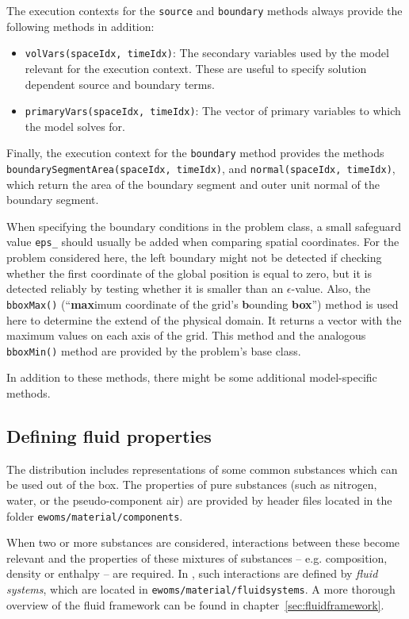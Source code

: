 The execution contexts for the \texttt{source} and \texttt{boundary}
methods always provide the following methods in addition:
\begin{itemize}
\item \texttt{volVars(spaceIdx, timeIdx)}: The secondary variables
  used by the model relevant for the execution context. These are
  useful to specify solution dependent source and boundary terms.
\item \texttt{primaryVars(spaceIdx, timeIdx)}: The vector of primary
  variables to which the model solves for.
\end{itemize}

Finally, the execution context for the \texttt{boundary} method
provides the methods \texttt{boundarySegmentArea(spaceIdx, timeIdx)},
and \texttt{normal(spaceIdx, timeIdx)}, which return the area of the
boundary segment and outer unit normal of the boundary segment.

When specifying the boundary conditions in the problem class, a small
safeguard value \texttt{eps\_} should usually be added when comparing
spatial coordinates. For the problem considered here, the left
boundary might not be detected if checking whether the first
coordinate of the global position is equal to zero, but it is detected
reliably by testing whether it is smaller than an
$\epsilon$-value. Also, the \texttt{bboxMax()} (``\textbf{max}imum
coordinate of the grid's \textbf{b}ounding \textbf{box}'') method is
used here to determine the extend of the physical domain. It returns a
vector with the maximum values on each axis of the grid. This method
and the analogous \texttt{bboxMin()} method are provided by the
problem's base class.

In addition to these methods, there might be some additional
model-specific methods. 

\subsection{Defining fluid properties}
\label{tutorial-coupled:description-fluid-class}

The \eWoms distribution includes representations of some common
substances which can be used out of the box. The properties of pure
substances (such as nitrogen, water, or the pseudo-component air) are
provided by header files located in the folder
\texttt{ewoms/material/components}.

When two or more substances are considered, interactions between these
become relevant and the properties of these mixtures of substances --
e.g. composition, density or enthalpy -- are required. In \eWoms, such
interactions are defined by {\em fluid systems}, which are located in
\texttt{ewoms/material/fluidsystems}. A more thorough overview of the
\eWoms fluid framework can be found in
chapter~\ref{sec:fluidframework}.

